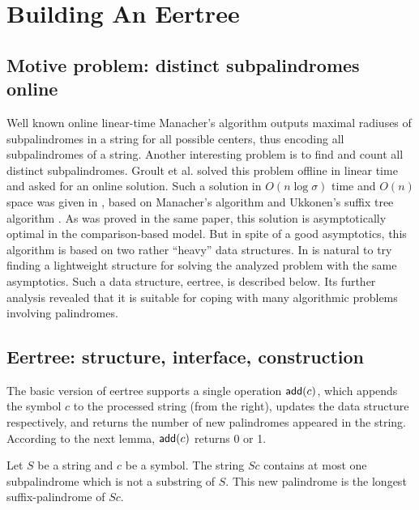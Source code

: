 \documentclass{llncs}
\def\add{{\sf add}}
\begin{document}
\section{Building An Eertree}\label{basicPart}

\subsection{Motive problem: distinct subpalindromes online}\label{motivation}

Well known online linear-time Manacher's algorithm \cite{Man75} outputs maximal radiuses of subpalindromes in a string for all possible centers, thus encoding all subpalindromes of a string. Another interesting problem is to find and count all distinct subpalindromes. Groult et al. \cite{GPR10} solved this problem offline in linear time and asked for an online solution. Such a solution in $O(n \log \sigma)$ time and $O(n)$ space was given in \cite{KRS13}, based on Manacher's algorithm and Ukkonen's suffix tree algorithm \cite{Ukk95}. As was proved in the same paper, this solution is asymptotically optimal in the comparison-based model. But in spite of a good asymptotics, this algorithm is based on two rather ``heavy'' data structures. In is natural to try finding a lightweight structure for solving the analyzed problem with the same asymptotics. Such a data structure, eertree, is described below. Its further analysis revealed that it is suitable for coping with many algorithmic problems involving palindromes.

\subsection{Eertree: structure, interface, construction}

The basic version of eertree supports a single operation $\add(c)$, which appends the symbol $c$ to the processed string (from the right), updates the data structure respectively, and returns the number of new palindromes appeared in the string. According to the next lemma, $\add(c)$ returns 0 or 1.

\begin{lemma} \label{nnodes}
Let $S$ be a string and $c$ be a symbol. The string $Sc$ contains at most one subpalindrome which is not a substring of $S$. This new palindrome is the longest suffix-palindrome of $Sc$.
\end{lemma}
\end{document}
